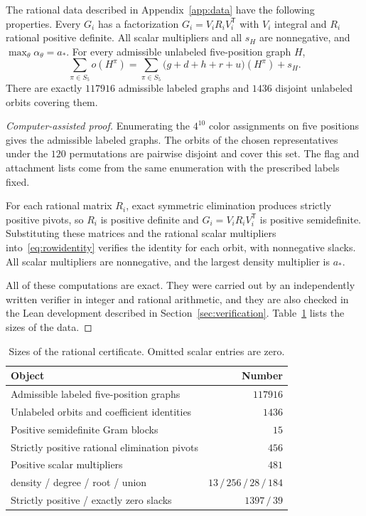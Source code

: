 \begin{lemma}\label{lem:certificate}
The rational data described in Appendix~\ref{app:data} have the following properties. Every $G_i$ has a factorization $G_i=V_iR_iV_i^{\mathsf T}$ with $V_i$ integral and $R_i$ rational positive definite. All scalar multipliers and all $s_H$ are nonnegative, and $\max_\theta\alpha_\theta=a_*$. For every admissible unlabeled five-position graph $H$,
\begin{equation}\label{eq:rowidentity}
 \sum_{\pi\in S_5}o(H^\pi)
 =\sum_{\pi\in S_5}\bigl(g+d+h+r+u\bigr)(H^\pi)+s_H.
\end{equation}
There are exactly $117916$ admissible labeled graphs and $1436$ disjoint unlabeled orbits covering them.
\end{lemma}
\begin{proof}[Computer-assisted proof]
Enumerating the $4^{10}$ color assignments on five positions gives the admissible labeled graphs. The orbits of the chosen representatives under the $120$ permutations are pairwise disjoint and cover this set. The flag and attachment lists come from the same enumeration with the prescribed labels fixed.

For each rational matrix $R_i$, exact symmetric elimination produces strictly positive pivots, so $R_i$ is positive definite and $G_i=V_iR_iV_i^{\mathsf T}$ is positive semidefinite. Substituting these matrices and the rational scalar multipliers into~\eqref{eq:rowidentity} verifies the identity for each orbit, with nonnegative slacks. All scalar multipliers are nonnegative, and the largest density multiplier is $a_*$.

All of these computations are exact. They were carried out by an independently written verifier in integer and rational arithmetic, and they are also checked in the Lean development described in Section~\ref{sec:verification}. Table~\ref{tab:certificate} lists the sizes of the data.
\end{proof}

\begin{table}[tb]
\centering
\caption{Sizes of the rational certificate. Omitted scalar entries are zero.}\label{tab:certificate}
\begin{tabular}{lr}
\toprule
Object & Number\\
\midrule
Admissible labeled five-position graphs & $117916$\\
Unlabeled orbits and coefficient identities & $1436$\\
Positive semidefinite Gram blocks & $15$\\
Strictly positive rational elimination pivots & $456$\\
Positive scalar multipliers & $481$\\
\quad density / degree / root / union & $13\,/\,256\,/\,28\,/\,184$\\
Strictly positive / exactly zero slacks & $1397\,/\,39$\\
\bottomrule
\end{tabular}
\end{table}

